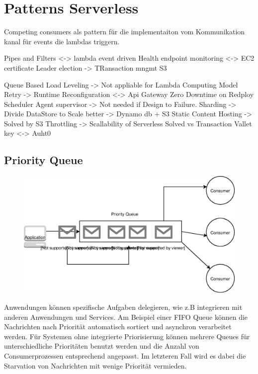 \documentclass[
12pt,
english,
ngerman,
headsepline,
twoside,
openright,
numbers=noenddot,version=first
]{scrreprt}
\begin{document}
\section{Patterns Serverless}

Competing consumers als pattern für die implementaiton vom Kommunikation kanal für events die lambdas triggern.

Pipes and Filters\cite{patternsCloud} <-> lambda event driven
Health endpoint monitoring <-> EC2 certificate
Leader election -> TRansaction mngmt S3


Queue Based Load Leveling -> Not appliable for Lambda Computing Model
Retry ->
Runtime Reconfiguration <-> Api Gateway Zero Downtime on Redploy
Scheduler Agent supervisor -> Not needed if Design to Failure.
Sharding -> Divide DataStore to Scale better -> Dynamo db + S3
Static Content Hosting -> Solved by S3
Throttling -> Scallability of Serverless Solved vs Transaction
Vallet key <-> Auht0

\subsection{Priority Queue}\label{sec:priority-queue}
\begin{figure}
	\includegraphics[scale=0.36]{./pics/pattern-priority-queue.eps}
\end{figure}
Anwendungen können spezifische Aufgaben delegieren, wie z.B integrieren mit anderen Anwendungen und Services. Am Beispiel einer FIFO Queue können die Nachrichten nach Priorität automatisch sortiert und asynchron verarbeitet werden. Für Systemen ohne integrierte Priorisierung können mehrere Queues für unterschiedliche Prioritäten benutzt werden und die Anzahl von Consumerprozessen entsprechend angepasst. Im letzteren Fall wird es dabei die Starvation von Nachrichten mit wenige Priorität vermieden.
\end{document}
